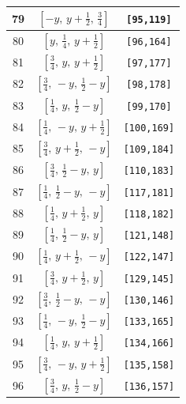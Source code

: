 \documentclass[fleqn,8pt]{jsarticle}
\begin{document}
\begin{longtable}{ccc}
79 & $\left[ - y,\, y + \frac{1}{2},\, \frac{3}{4} \right]$ & {\tt [95,119]} \\ \hline
80 & $\left[ y,\, \frac{1}{4},\, y + \frac{1}{2} \right]$ & {\tt [96,164]} \\ \hline
81 & $\left[ \frac{3}{4},\, y,\, y + \frac{1}{2} \right]$ & {\tt [97,177]} \\ \hline
82 & $\left[ \frac{3}{4},\, - y,\, \frac{1}{2} - y \right]$ & {\tt [98,178]} \\ \hline
83 & $\left[ \frac{1}{4},\, y,\, \frac{1}{2} - y \right]$ & {\tt [99,170]} \\ \hline
84 & $\left[ \frac{1}{4},\, - y,\, y + \frac{1}{2} \right]$ & {\tt [100,169]} \\ \hline
85 & $\left[ \frac{3}{4},\, y + \frac{1}{2},\, - y \right]$ & {\tt [109,184]} \\ \hline
86 & $\left[ \frac{3}{4},\, \frac{1}{2} - y,\, y \right]$ & {\tt [110,183]} \\ \hline
87 & $\left[ \frac{1}{4},\, \frac{1}{2} - y,\, - y \right]$ & {\tt [117,181]} \\ \hline
88 & $\left[ \frac{1}{4},\, y + \frac{1}{2},\, y \right]$ & {\tt [118,182]} \\ \hline
89 & $\left[ \frac{1}{4},\, \frac{1}{2} - y,\, y \right]$ & {\tt [121,148]} \\ \hline
90 & $\left[ \frac{1}{4},\, y + \frac{1}{2},\, - y \right]$ & {\tt [122,147]} \\ \hline
91 & $\left[ \frac{3}{4},\, y + \frac{1}{2},\, y \right]$ & {\tt [129,145]} \\ \hline
92 & $\left[ \frac{3}{4},\, \frac{1}{2} - y,\, - y \right]$ & {\tt [130,146]} \\ \hline
93 & $\left[ \frac{1}{4},\, - y,\, \frac{1}{2} - y \right]$ & {\tt [133,165]} \\ \hline
94 & $\left[ \frac{1}{4},\, y,\, y + \frac{1}{2} \right]$ & {\tt [134,166]} \\ \hline
95 & $\left[ \frac{3}{4},\, - y,\, y + \frac{1}{2} \right]$ & {\tt [135,158]} \\ \hline
96 & $\left[ \frac{3}{4},\, y,\, \frac{1}{2} - y \right]$ & {\tt [136,157]} \\
\end{longtable}
\renewcommand{\arraystretch}{1.2}
\end{document}

